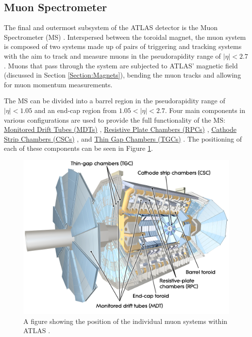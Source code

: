 \documentclass[12pt,a4paper,epsf,portrait,times,epsfig]{report}
\begin{document}
		\subsection{Muon Spectrometer}\label{Section:MuonSystem}

		The final and outermost subsystem of the ATLAS detector is the Muon Spectrometer (MS) \cite{ATLASMuonTDR}. Interspersed between the toroidal magnet, the muon system is composed of two systems made up of pairs of triggering and tracking systems with the aim to track and measure muons in the pseudorapidity range of $|\eta| < 2.7$. Muons that pass through the system are subjected to ATLAS' magnetic field (discussed in Section \ref{Section:Magnets}), bending the muon tracks and allowing for muon momentum measurements. \par

		The MS can be divided into a barrel region in the pseudorapidity range of $|\eta| < 1.05$ and an end-cap region from $1.05 < |\eta| < 2.7$. Four main components in various configurations are used to provide the full functionality of the MS: \hyperref[Section:MDTs]{Monitored Drift Tubes (MDTs)} \cite{ATLASMDT}, \hyperref[Section:RPCs]{Resistive Plate Chambers (RPCs)} \cite{ATLASRPC}, \hyperref[Section:CSCs]{Cathode Strip Chambers (CSCs)} \cite{ATLASCSC}, and \hyperref[Section:TGCs]{Thin Gap Chambers (TGCs)} \cite{ATLASTGC}. The positioning of each of these components can be seen in Figure \ref{Fig:MuonSystem}. 

		\begin{figure}
			\centering
			\includegraphics[scale=0.3]{Muon_System}
			\caption{A figure showing the position of the individual muon systems within ATLAS \cite{Article:ATLASDesignPaper}.}
			\label{Fig:MuonSystem}
		\end{figure}
\end{document}
